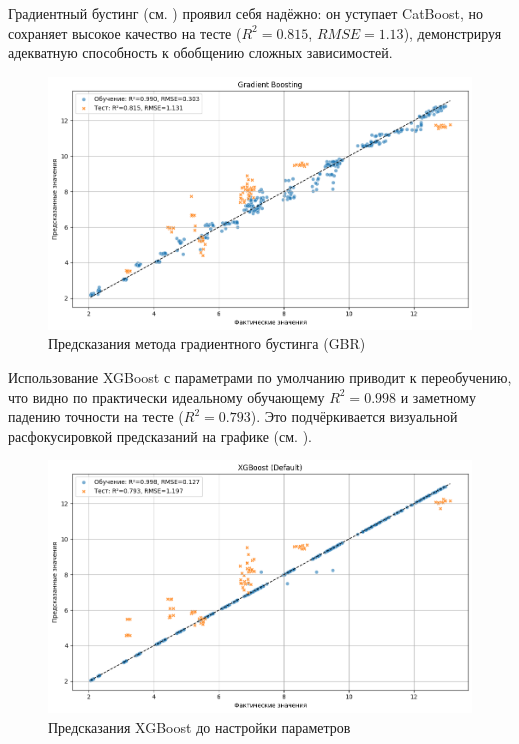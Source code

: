 Градиентный бустинг (см. ) проявил себя надёжно: он уступает CatBoost, но сохраняет высокое качество на тесте ($R^2 = 0.815$, $RMSE = 1.13$), демонстрируя адекватную способность к обобщению сложных зависимостей.

\begin{figure}[htbp!]
	\centering
	\includegraphics[width=.9\linewidth]{my_folder/images/coverage/Gradient-Boosting.png}
	\caption{Предсказания метода градиентного бустинга (GBR)} 
	\label{fig:coverage-gbr}  
\end{figure}

Использование XGBoost с параметрами по умолчанию приводит к переобучению, что видно по практически идеальному обучающему $R^2 = 0.998$ и заметному падению точности на тесте ($R^2 = 0.793$). Это подчёркивается визуальной расфокусировкой предсказаний на графике (см. ).

\begin{figure}[htbp!]
	\centering
	\includegraphics[width=.8\linewidth]{my_folder/images/coverage/XGBoost-overfiting.png}
	\caption{Предсказания XGBoost до настройки параметров} 
	\label{fig:coverage-xgboost-overfit}  
\end{figure}

